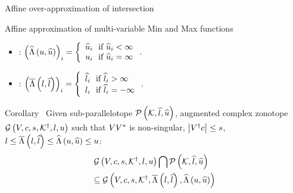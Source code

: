 \begin{frame}{Affine over-approximation of intersection}
\begin{exampleblock}{Affine approximation of multi-variable Min and Max functions}
{\small
\begin{itemize}
\item {}:
$\left(\widehat{\Lambda}\left(u,\widehat{u}\right)\right)_i = \left\{
\begin{array}{l}
\widehat{u}_i~~\text{if}~\widehat{u}_i<\infty\\
u_i~~\text{if}~\widehat{u}_i=\infty
\end{array}
\right..$\\
\item {}:
$\left(\overline{\Lambda}\left(l,\widehat{l}\right)\right)_i = \left\{
\begin{array}{l}
\widehat{l}_i~~\text{if}~\widehat{l}_i>\infty\\
l_i~~\text{if}~\widehat{l}_i=-\infty
\end{array}
\right..$
\end{itemize}
}
\end{exampleblock}
\begin{block}{Corollary}~\label{thm:acz-int}
{\small Given sub-parallelotope {$\mathcal{P}\left(\mathcal{K},\widehat{l},\widehat{u}\right)$},
augmented complex zonotope {$\mathcal{G}\left(V,c,s,{\mathcal{K}}^\dagger,l,u\right)$}
such that {$VV^*$ is non-singular, $\left|{V}^\dagger c\right|\leq s$, $l\leq
\overline{\Lambda}\left(l,\widehat{l}\right)\leq \widehat{\Lambda}\left(u,\widehat{u}\right)\leq u$}:}
\vspace{-1em}
{\color{purple}
\begin{align*}
\begin{split}
&{\mathcal{G}\left(V,c,s,{\mathcal{K}}^\dagger,l,u\right)\bigcap\mathcal{P}\left(\mathcal{K},\widehat{l},\widehat{u}\right)}\\
& {\subseteq \mathcal{G}\left(V,c,s,{\mathcal{K}}^\dagger,\overline{\Lambda}\left(l,\widehat{l}\right),\widehat{\Lambda}\left(u,\widehat{u}\right)\right)}
\end{split}
\end{align*}
}
\end{block}
\end{frame}


